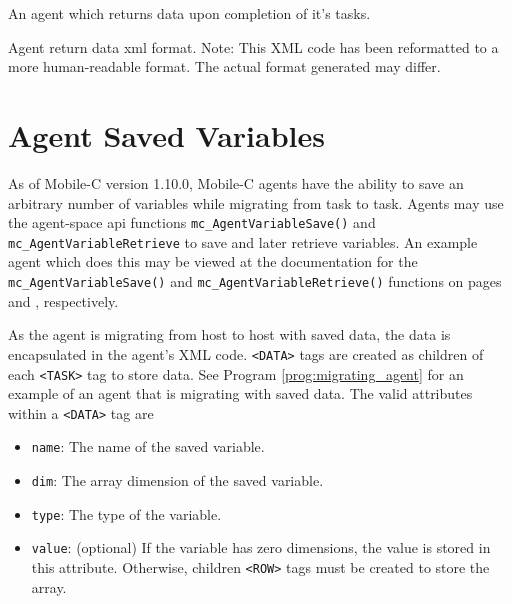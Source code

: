 \documentclass[11pt]{report}
\begin{document}
\begin{Program}[p]
\begin{center}
   {\footnotesize \linespread{1.0} 
     }
\end{center}
\caption{An agent which returns data upon completion of it's tasks.}
\label{prog:agent_with_return_data}
\end{Program}

\begin{Program}[p]
\begin{center}
   {\footnotesize \linespread{1.0} 
     }
\end{center}
\caption{Agent return data xml format. Note: This XML code has been reformatted
  to a more human-readable format. The actual format generated may differ.}
\label{prog:return_agent}
\end{Program}

\section{Agent Saved Variables}
As of Mobile-C version 1.10.0, Mobile-C agents have the ability to save an 
arbitrary number of variables while migrating from task to task. Agents may
use the agent-space api functions \texttt{mc\_AgentVariableSave()} and
\texttt{mc\_AgentVariableRetrieve} to save and later retrieve variables.
An example agent which does this may be viewed at the documentation for
the \texttt{mc\_AgentVariableSave()} and \linebreak \texttt{mc\_AgentVariableRetrieve()}
functions on pages \pageref{apidoc:mc_AgentVariableSave} and 
\pageref{apidoc:mc_AgentVariableRetrieve}, respectively.

As the agent is migrating from host to host with saved data, the data is 
encapsulated in the agent's XML code. \texttt{<DATA>} tags are created as
children of each \texttt{<TASK>} tag to store data. See Program 
\ref{prog:migrating_agent} for an example of an agent that is migrating
with saved data. The valid attributes within a \texttt{<DATA>} tag are
\begin{itemize}
\item \texttt{name}: The name of the saved variable.
\item \texttt{dim}: The array dimension of the saved variable. 
\item \texttt{type}: The type of the variable.
\item \texttt{value}: (optional) If the variable has zero dimensions, the
  value is stored in this attribute. Otherwise, children \texttt{<ROW>} 
  tags must be created to store the array.
\end{itemize}
\end{document}
